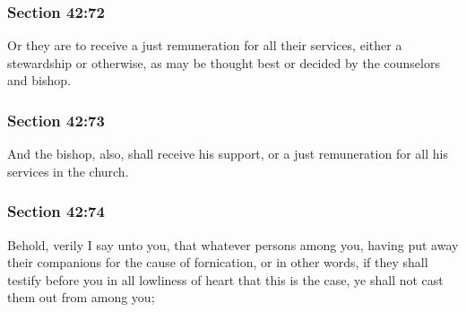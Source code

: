 	\subsubsection{Section 42:72} %
		\label{DC42-72}

		Or they are to receive a just remuneration for all their services, either a stewardship or otherwise, as may be thought best or decided by the counselors and bishop.


	\subsubsection{Section 42:73} %
		\label{DC42-73}

		And the bishop, also, shall receive his support, or a just remuneration for all his services in the church.


	\subsubsection{Section 42:74} %
		\label{DC42-74}

		Behold, verily I say unto you, that whatever persons among you, having put away their companions for the cause of fornication, or in other words, if they shall testify before you in all lowliness of heart that this is the case, ye shall not cast them out from among you;


